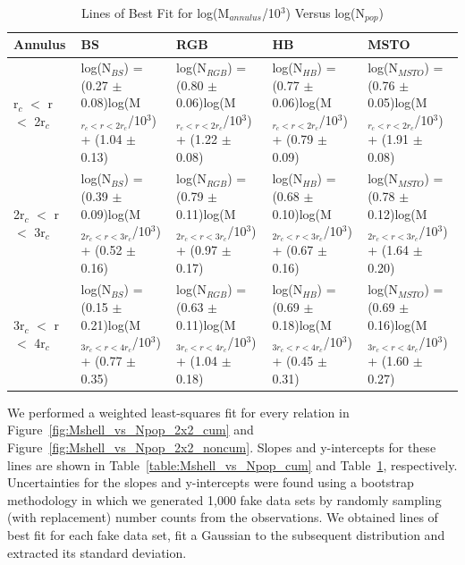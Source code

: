\begin{table}
\tiny
\centering
\caption{Lines of Best Fit for log(M$_{annulus}$/10$^3$) Versus log(N$_{pop}$)
  \label{table:Mshell_vs_Npop_noncum}}
\begin{tabular}{|l|p{4.1cm}|p{4.1cm}|p{4.1cm}|p{4.1cm}|}
\hline
Annulus                 &         BS        &        RGB        &        HB       &       MSTO      \\
\hline
 r$_c$ $<$ r $<$ 2r$_c$ & log(N$_{BS}$) = (0.27 $\pm$ 0.08)log(M$_{r_c < r < 2r_c}$/10$^3$) + (1.04 $\pm$ 0.13)  &    log(N$_{RGB}$) = (0.80 $\pm$ 0.06)log(M$_{r_c < r < 2r_c}$/10$^3$) + (1.22 $\pm$ 0.08)    & log(N$_{HB}$) = (0.77 $\pm$ 0.06)log(M$_{r_c < r < 2r_c}$/10$^3$) + (0.79 $\pm$ 0.09)   & log(N$_{MSTO}$) = (0.76 $\pm$ 0.05)log(M$_{r_c < r < 2r_c}$/10$^3$) + (1.91 $\pm$ 0.08)    \\
2r$_c$ $<$ r $<$ 3r$_c$ & log(N$_{BS}$) = (0.39 $\pm$ 0.09)log(M$_{2r_c < r < 3r_c}$/10$^3$) + (0.52 $\pm$ 0.16)  &    log(N$_{RGB}$) = (0.79 $\pm$ 0.11)log(M$_{2r_c < r < 3r_c}$/10$^3$) + (0.97 $\pm$ 0.17)    & log(N$_{HB}$) = (0.68 $\pm$ 0.10)log(M$_{2r_c < r < 3r_c}$/10$^3$) + (0.67 $\pm$ 0.16) & log(N$_{MSTO}$) = (0.78 $\pm$ 0.12)log(M$_{2r_c < r < 3r_c}$/10$^3$) + (1.64 $\pm$ 0.20)    \\
3r$_c$ $<$ r $<$ 4r$_c$ & log(N$_{BS}$) = (0.15 $\pm$ 0.21)log(M$_{3r_c < r < 4r_c}$/10$^3$) + (0.77 $\pm$ 0.35)  &    log(N$_{RGB}$) = (0.63 $\pm$ 0.11)log(M$_{3r_c < r < 4r_c}$/10$^3$) + (1.04 $\pm$ 0.18)    & log(N$_{HB}$) = (0.69 $\pm$ 0.18)log(M$_{3r_c < r < 4r_c}$/10$^3$) + (0.45 $\pm$ 0.31) & log(N$_{MSTO}$) = (0.69 $\pm$ 0.16)log(M$_{3r_c < r < 4r_c}$/10$^3$) + (1.60 $\pm$ 0.27)    \\
\hline
\end{tabular}
\end{table}

\clearpage

We performed a weighted least-squares fit for every relation in
Figure~\ref{fig:Mshell_vs_Npop_2x2_cum} and
Figure~\ref{fig:Mshell_vs_Npop_2x2_noncum}.  Slopes and y-intercepts
for these lines are shown in Table~\ref{table:Mshell_vs_Npop_cum} and
Table~\ref{table:Mshell_vs_Npop_noncum}, respectively.  Uncertainties for the
slopes and y-intercepts were 
found using a bootstrap methodology in which we generated 1,000 fake
data sets by randomly sampling (with replacement) number counts from the
observations.  We obtained lines of best fit for each fake data set, fit a
Gaussian to the subsequent distribution and extracted its standard
deviation.  

